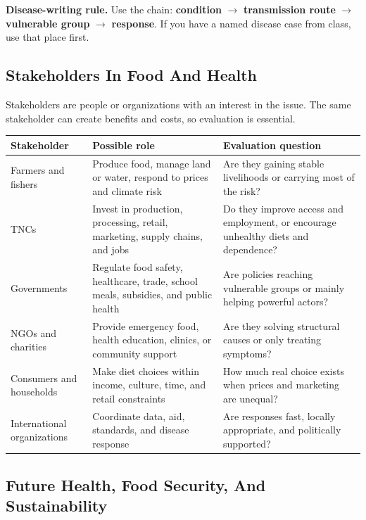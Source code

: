 \documentclass[11pt,a4paper]{article}
\newcommand{\term}[1]{\textcolor{HeadingBlue}{\textbf{#1}}}
\newcommand{\boxnote}[3]{%
\noindent\colorbox{#1}{%
  \begin{minipage}{0.965\textwidth}
  \sffamily
  \textbf{\textcolor{HeadingBlue}{#2}} #3
  \end{minipage}
}}
\begin{document}
\boxnote{SoftBlue}{Disease-writing rule.}{Use the chain:
\term{condition} $\rightarrow$ \term{transmission route} $\rightarrow$
\term{vulnerable group} $\rightarrow$ \term{response}. If you have a named
disease case from class, use that place first.}

\subsection{Stakeholders In Food And Health}

Stakeholders are people or organizations with an interest in the issue. The
same stakeholder can create benefits and costs, so evaluation is essential.

\begin{tabularx}{\textwidth}{L{0.22\textwidth}Y Y}
\toprule
\textbf{Stakeholder} & \textbf{Possible role} & \textbf{Evaluation question} \\
\midrule
Farmers and fishers & Produce food, manage land or water, respond to prices
and climate risk & Are they gaining stable livelihoods or carrying most of the
risk? \\
TNCs & Invest in production, processing, retail, marketing, supply chains, and
jobs & Do they improve access and employment, or encourage unhealthy diets and
dependence? \\
Governments & Regulate food safety, healthcare, trade, school meals, subsidies,
and public health & Are policies reaching vulnerable groups or mainly helping
powerful actors? \\
NGOs and charities & Provide emergency food, health education, clinics, or
community support & Are they solving structural causes or only treating
symptoms? \\
Consumers and households & Make diet choices within income, culture, time, and
retail constraints & How much real choice exists when prices and marketing are
unequal? \\
International organizations & Coordinate data, aid, standards, and disease
response & Are responses fast, locally appropriate, and politically supported? \\
\bottomrule
\end{tabularx}

\subsection{Future Health, Food Security, And Sustainability}
\end{document}
